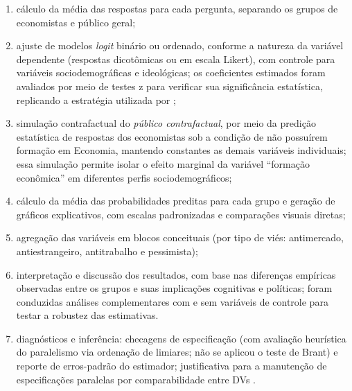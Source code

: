 \begin{enumerate}[label=\alph*)]
    \item cálculo da média das respostas para cada pergunta, separando os grupos de economistas e público geral;
    
    \item ajuste de modelos \textit{logit} binário ou ordenado, conforme a natureza da variável dependente (respostas dicotômicas ou em escala Likert), com controle para variáveis sociodemográficas e ideológicas; os coeficientes estimados foram avaliados por meio de testes z para verificar sua significância estatística, replicando a estratégia utilizada por ;
    
    \item simulação contrafactual do \textit{público contrafactual}, por meio da predição estatística de respostas dos economistas sob a condição de não possuírem formação em Economia, mantendo constantes as demais variáveis individuais; essa simulação permite isolar o efeito marginal da variável ``formação econômica'' em diferentes perfis sociodemográficos;
    
    \item cálculo da média das probabilidades preditas para cada grupo e geração de gráficos explicativos, com escalas padronizadas e comparações visuais diretas;
    
    \item agregação das variáveis em blocos conceituais (por tipo de viés: antimercado, antiestrangeiro, antitrabalho e pessimista);
    
    \item interpretação e discussão dos resultados, com base nas diferenças empíricas observadas entre os grupos e suas implicações cognitivas e políticas; foram conduzidas análises complementares com e sem variáveis de controle para testar a robustez das estimativas.

    
    \item diagnósticos e inferência: checagens de especificação (com avaliação heurística do paralelismo via ordenação de limiares; não se aplicou o teste de Brant) e reporte de erros-padrão do estimador; justificativa para a manutenção de especificações paralelas por comparabilidade entre DVs \cite{stigum2003}.

\end{enumerate}

